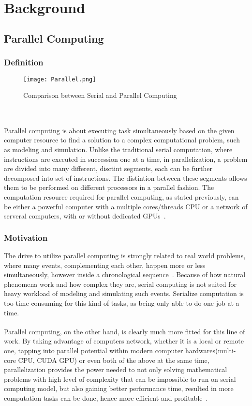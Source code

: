 \chapter{Background}

\section{Parallel Computing}

\subsection{Definition}

\begin{figure}[H]
\texttt{[image: Parallel.png]}
\centering
\caption{Comparison between Serial and Parallel Computing}
\end{figure}
~\\
~\\
Parallel computing is about executing task simultaneously based on the given computer resource to find a solution to a complex computational problem, such as modeling and simulation. Unlike the traditional serial computation, where instructions are executed in succession one at a time, in parallelization, a problem are divided into many different, disctint segments, each can be further decomposed into set of instructions. The distintion between these segments allows them to be performed on different processors in a parallel fashion. The computation resource required for parallel computing, as stated previously, can be either a powerful computer with a multiple cores/threads CPU or a network of serveral computers, with or without dedicated GPUs~\cite{intro_parallel}. \\


\subsection{Motivation}

The drive to utilize parallel computing is strongly related to real world problems, where many events, complementing each other, happen more or less simultaneously, however inside a chronological sequence~\cite{intro_parallel}. Because of how natural phenomena work and how complex they are, serial computing is not suited for heavy workload of modeling and simulating such events. Serialize computation is too time-consuming for this kind of tasks, as being only able to do one job at a time. \\
~\\
Parallel computing, on the other hand, is clearly much more fitted for this line of work. By taking advantage of computers network, whether it is a local or remote one, tapping into parallel potential within modern computer hardwares(multi-core CPU, CUDA GPU) or even both of the above at the same time, parallelization provides the power needed to not only solving mathematical problems with high level of complexity that can be impossible to run on serial computing model, but also gaining better performance time, resulted in more computation tasks can be done, hence more efficient and profitable~\cite{intro_parallel}. \\


